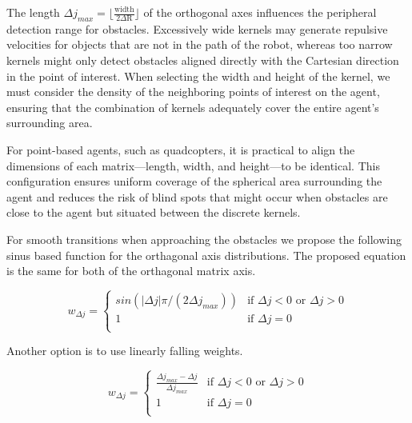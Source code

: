 \documentclass[letterpaper, 10 pt, conference]{ieeeconf}  %
\begin{document}

The length $\Delta j_{max} = \lfloor \frac{\mathrm{width}}{2 \Delta \mathrm{R}} \rfloor$ of the orthogonal axes influences the peripheral detection range for obstacles. Excessively wide kernels may generate repulsive velocities for objects that are not in the path of the robot, whereas too narrow kernels might only detect obstacles aligned directly with the Cartesian direction in the point of interest. When selecting the width and height of the kernel, we must consider the density of the neighboring points of interest on the agent, ensuring that the combination of kernels adequately cover the entire agent's surrounding area. 

For point-based agents, such as quadcopters, it is practical to align the dimensions of each matrix—length, width, and height—to be identical. This configuration ensures uniform coverage of the spherical area surrounding the agent and reduces the risk of blind spots that might occur when obstacles are close to the agent but situated between the discrete kernels.

For smooth transitions when approaching the obstacles we propose the following sinus based function for the orthagonal axis distributions. The proposed equation is the same for both of the orthagonal matrix axis.

\begin{equation}
	w_{\Delta j} =
	\begin{cases} 
		sin(\left| \Delta j \right| \pi / (2 \Delta j_{max})) & \text{if } \Delta j < 0 \text{~or }  \Delta j > 0 \\
		1 & \text{if } \Delta j = 0 \\
	\end{cases}
\end{equation}

Another option is to use linearly falling weights.

\begin{equation}
	w_{\Delta j} =
	\begin{cases} 
		\frac{\Delta j_{max} - \Delta j }{\Delta j_{max}} & \text{if } \Delta j < 0 \text{~or }  \Delta j > 0 \\
		1 & \text{if } \Delta j = 0 \\
	\end{cases}
\end{equation}
\end{document}
